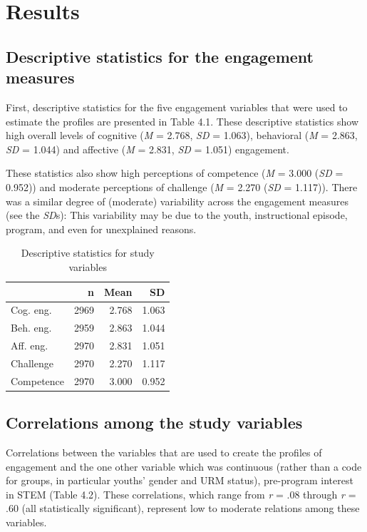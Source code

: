\documentclass[]{book}
\theoremstyle{definition}
\theoremstyle{definition}
\theoremstyle{definition}
\theoremstyle{remark}
\begin{document}
\chapter{Results}\label{results}

\section{Descriptive statistics for the engagement
measures}\label{descriptive-statistics-for-the-engagement-measures}

First, descriptive statistics for the five engagement variables that
were used to estimate the profiles are presented in Table 4.1. These
descriptive statistics show high overall levels of cognitive (\emph{M} =
2.768, \emph{SD} = 1.063), behavioral (\emph{M} = 2.863, \emph{SD} =
1.044) and affective (\emph{M} = 2.831, \emph{SD} = 1.051) engagement.

These statistics also show high perceptions of competence (\emph{M} =
3.000 (\emph{SD} = 0.952)) and moderate perceptions of challenge
(\emph{M} = 2.270 (\emph{SD} = 1.117)). There was a similar degree of
(moderate) variability across the engagement measures (see the
\emph{SD}s): This variability may be due to the youth, instructional
episode, program, and even for unexplained reasons.

\begin{table}

\caption{\label{tab:unnamed-chunk-7}Descriptive statistics for study variables}
\centering
\begin{tabular}[t]{lrrr}
\toprule
 & n & Mean & SD\\
\midrule
Cog. eng. & 2969 & 2.768 & 1.063\\
Beh. eng. & 2959 & 2.863 & 1.044\\
Aff. eng. & 2970 & 2.831 & 1.051\\
Challenge & 2970 & 2.270 & 1.117\\
Competence & 2970 & 3.000 & 0.952\\
\bottomrule
\end{tabular}
\end{table}

\section{Correlations among the study
variables}\label{correlations-among-the-study-variables}

Correlations between the variables that are used to create the profiles
of engagement and the one other variable which was continuous (rather
than a code for groups, in particular youths' gender and URM status),
pre-program interest in STEM (Table 4.2). These correlations, which
range from \emph{r} = .08 through \emph{r} = .60 (all statistically
significant), represent low to moderate relations among these variables.
\end{document}
